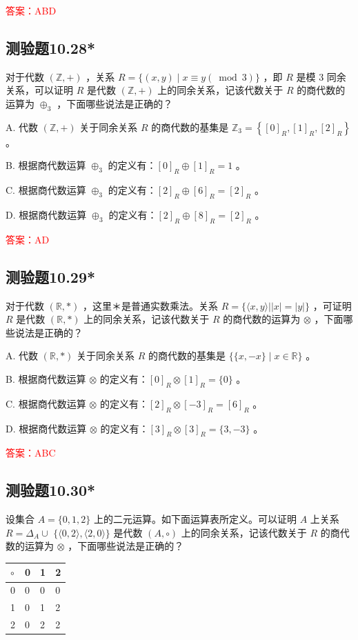\documentclass[UTF8, heading=true]{ctexart}
\begin{document}
\textcolor{red}{答案：ABD}

\subsection{测验题10.28*}

对于代数 $(\mathbb{Z},+)$ ，关系 $R=\{(x, y) \mid x \equiv y(\bmod 3)\}$ ，即 $R$ 是模 3 同余关系，可以证明 $R$ 是代数 $(\mathbb{Z},+)$ 上的同余关系，记该代数关于 $R$ 的商代数的运算为 $\oplus_3$ ，下面哪些说法是正确的？

A. 代数 $(\mathbb{Z},+)$ 关于同余关系 $R$ 的商代数的基集是 $\mathbb{Z}_3=\left\{[0]_R,[1]_R,[2]_R\right\}$ 。

B. 根据商代数运算 $\oplus_3$ 的定义有：$[0]_R \oplus[1]_R=1$ 。

C. 根据商代数运算 $\oplus_3$ 的定义有：$[2]_R \oplus[6]_R=[2]_R$ 。

D. 根据商代数运算 $\oplus_3$ 的定义有：$[2]_R \oplus[8]_R=[2]_R$ 。

\textcolor{red}{答案：AD}

\subsection{测验题10.29*}

对于代数 $(\mathbb{R}, *)$ ，这里＊是普通实数乘法。关系 $R=\{\langle x, y\rangle| | x|=|y|\}$ ，可证明 $R$ 是代数 $(\mathbb{R}, *)$ 上的同余关系，记该代数关于 $R$ 的商代数的运算为 $\otimes$ ，下面哪些说法是正确的？

A. 代数 $(\mathbb{R}, *)$ 关于同余关系 $R$ 的商代数的基集是 $\{\{x,-x\} \mid x \in \mathbb{R}\}$ 。

B. 根据商代数运算 $\otimes$ 的定义有：$[0]_R \otimes[1]_R=\{0\}$ 。

C. 根据商代数运算 $\otimes$ 的定义有：$[2]_R \otimes[-3]_R=[6]_R$ 。

D. 根据商代数运算 $\otimes$ 的定义有：$[3]_R \otimes[3]_R=\{3,-3\}$ 。

\textcolor{red}{答案：ABC}

\subsection{测验题10.30*}

设集合 $A=\{0,1,2\}$ 上的二元运算。如下面运算表所定义。可以证明 $A$ 上关系 $R=\Delta_A \cup$ $\{\langle 0,2\rangle,\langle 2,0\rangle\}$ 是代数 $(A, \circ)$ 上的同余关系，记该代数关于 $R$ 的商代数的运算为 $\otimes$ ，下面哪些说法是正确的？
\begin{table}[H]
  \renewcommand{\arraystretch}{1.5}
  \centering
  \begin{tabular}{l|lll}
\hline$\circ$ & 0 & 1 & 2 \\
\hline 0 & 0 & 0 & 0 \\
1 & 0 & 1 & 2 \\
2 & 0 & 2 & 2 \\
\hline
\end{tabular}
\end{table}
\end{document}
